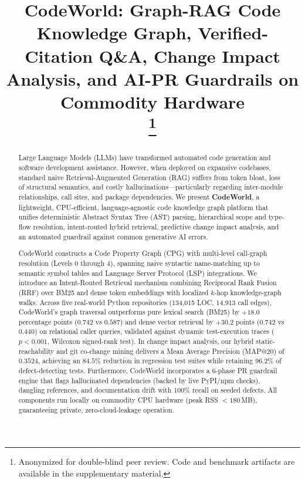 \documentclass[conference]{IEEEtran}
\begin{document}
\title{CodeWorld: Graph-RAG Code Knowledge Graph, Verified-Citation Q\&A, Change Impact Analysis, and AI-PR Guardrails on Commodity Hardware\\
\thanks{Anonymized for double-blind peer review. Code and benchmark artifacts are available in the supplementary material.}
}

\author{
}

\maketitle

\begin{abstract}
Large Language Models (LLMs) have transformed automated code generation and software development assistance. However, when deployed on expansive codebases, standard naive Retrieval-Augmented Generation (RAG) suffers from token bloat, loss of structural semantics, and costly hallucinations---particularly regarding inter-module relationships, call sites, and package dependencies. We present \textbf{CodeWorld}, a lightweight, CPU-efficient, language-agnostic code knowledge graph platform that unifies deterministic Abstract Syntax Tree (AST) parsing, hierarchical scope and type-flow resolution, intent-routed hybrid retrieval, predictive change impact analysis, and an automated guardrail against common generative AI errors.

CodeWorld constructs a Code Property Graph (CPG) with multi-level call-graph resolution (Levels 0 through 4), spanning naive syntactic name-matching up to semantic symbol tables and Language Server Protocol (LSP) integrations. We introduce an Intent-Routed Retrieval mechanism combining Reciprocal Rank Fusion (RRF) over BM25 and dense token embeddings with localized $k$-hop knowledge-graph walks. Across five real-world Python repositories (134,015 LOC, 14,913 call edges), CodeWorld's graph traversal outperforms pure lexical search (BM25) by $+18.0$ percentage points ($0.742$ vs $0.587$) and dense vector retrieval by $+30.2$ points ($0.742$ vs $0.440$) on relational caller queries, validated against dynamic test-execution traces ($p < 0.001$, Wilcoxon signed-rank test). In change impact analysis, our hybrid static-reachability and git co-change mining delivers a Mean Average Precision (MAP@20) of $0.3524$, achieving an $84.5\%$ reduction in regression test suites while retaining $96.2\%$ of defect-detecting tests. Furthermore, CodeWorld incorporates a 6-phase PR guardrail engine that flags hallucinated dependencies (backed by live PyPI/npm checks), dangling references, and documentation drift with $100\%$ recall on seeded defects. All components run locally on commodity CPU hardware (peak RSS $< 180$\,MB), guaranteeing private, zero-cloud-leakage operation.
\end{abstract}
\end{document}
